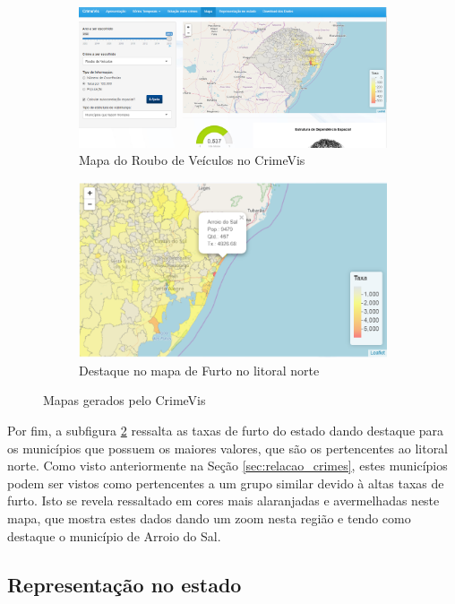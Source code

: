 \documentclass[12pt,openright,oneside,a4paper,english,french,spanish]{abntex2}
\numberwithin{table}{section} %
\numberwithin{figure}{section} %
\begin{document}
\begin{figure}[H]
\begin{subfigure}{.55\textwidth}
  \centering
  \includegraphics[width=.85\linewidth]{mapa_roubo_veic.png}
  \caption{Mapa do Roubo de Veículos no CrimeVis}
  \label{fig:mapa_roub}
\end{subfigure}%
\begin{subfigure}{.55\textwidth}
  \centering
  \includegraphics[width=.85\linewidth]{mapa_destaque_furto.png}
  \caption{Destaque no mapa de Furto no litoral norte}
  \label{fig:mapa_furto}
\end{subfigure}
\caption{Mapas gerados pelo CrimeVis}
\label{fig:mapa_crimevis}
\end{figure}

Por fim, a subfigura \ref{fig:mapa_furto} ressalta as taxas de furto do estado dando destaque para os municípios que possuem os maiores valores, que são os pertencentes ao litoral norte. Como visto anteriormente na Seção \ref{sec:relacao_crimes}, estes municípios podem ser vistos como pertencentes a um grupo similar devido à altas taxas de furto. Isto se revela ressaltado em cores mais alaranjadas e avermelhadas neste mapa, que mostra estes dados dando um zoom nesta região e tendo como destaque o município de Arroio do Sal.



\subsection{Representação no estado\label{sec:representacao}}
\end{document}
